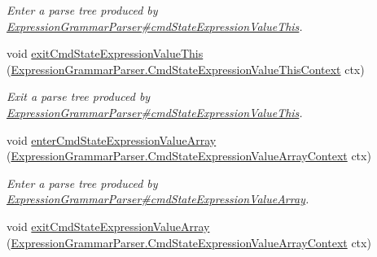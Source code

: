 \begin{DoxyCompactItemize}
\begin{DoxyCompactList}\small\item\em Enter a parse tree produced by \hyperlink{classgov_1_1nasa_1_1jpf_1_1inspector_1_1server_1_1expression_1_1parser_1_1_expression_grammar_parser_accf212342e54a654e9832816edfce8e4}{Expression\+Grammar\+Parser\#cmd\+State\+Expression\+Value\+This}. \end{DoxyCompactList}\item 
void \hyperlink{interfacegov_1_1nasa_1_1jpf_1_1inspector_1_1server_1_1expression_1_1parser_1_1_expression_grammar_listener_af5aeb90f1b65947d9c108ea6e4ec648b}{exit\+Cmd\+State\+Expression\+Value\+This} (\hyperlink{classgov_1_1nasa_1_1jpf_1_1inspector_1_1server_1_1expression_1_1parser_1_1_expression_grammar_pa5c670e8752735864512a29116a6ade67}{Expression\+Grammar\+Parser.\+Cmd\+State\+Expression\+Value\+This\+Context} ctx)
\begin{DoxyCompactList}\small\item\em Exit a parse tree produced by \hyperlink{classgov_1_1nasa_1_1jpf_1_1inspector_1_1server_1_1expression_1_1parser_1_1_expression_grammar_parser_accf212342e54a654e9832816edfce8e4}{Expression\+Grammar\+Parser\#cmd\+State\+Expression\+Value\+This}. \end{DoxyCompactList}\item 
void \hyperlink{interfacegov_1_1nasa_1_1jpf_1_1inspector_1_1server_1_1expression_1_1parser_1_1_expression_grammar_listener_a0f789ed0fecf20626fb9c5876a4bcfc2}{enter\+Cmd\+State\+Expression\+Value\+Array} (\hyperlink{classgov_1_1nasa_1_1jpf_1_1inspector_1_1server_1_1expression_1_1parser_1_1_expression_grammar_pa4110664045d2bee8d9164488bf2614d4}{Expression\+Grammar\+Parser.\+Cmd\+State\+Expression\+Value\+Array\+Context} ctx)
\begin{DoxyCompactList}\small\item\em Enter a parse tree produced by \hyperlink{classgov_1_1nasa_1_1jpf_1_1inspector_1_1server_1_1expression_1_1parser_1_1_expression_grammar_parser_a5ca6781f2d54419c03ff89334158c305}{Expression\+Grammar\+Parser\#cmd\+State\+Expression\+Value\+Array}. \end{DoxyCompactList}\item 
void \hyperlink{interfacegov_1_1nasa_1_1jpf_1_1inspector_1_1server_1_1expression_1_1parser_1_1_expression_grammar_listener_a1ab7a4b226c6f6e147326007f6a78b4f}{exit\+Cmd\+State\+Expression\+Value\+Array} (\hyperlink{classgov_1_1nasa_1_1jpf_1_1inspector_1_1server_1_1expression_1_1parser_1_1_expression_grammar_pa4110664045d2bee8d9164488bf2614d4}{Expression\+Grammar\+Parser.\+Cmd\+State\+Expression\+Value\+Array\+Context} ctx)

\end{DoxyCompactItemize}
